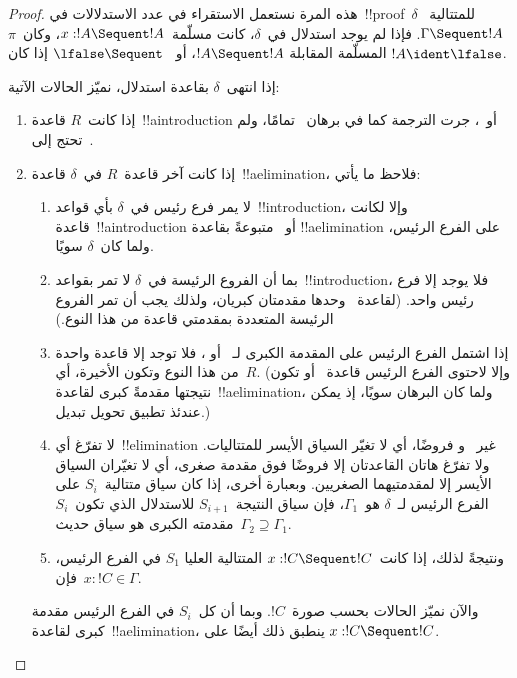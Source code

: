 \documentclass[../../../include/open-logic-section]{subfiles}
\begin{document}
\begin{proof}
هذه المرة نستعمل الاستقراء في عدد الاستدلالات في~!!{proof}~$\delta$
للمتتالية~$\Gamma \Sequent !A$. فإذا لم يوجد استدلال في~$\delta$، كانت
مسلّمة~$x:!A \Sequent !A$، وكان~$\pi$ المسلّمة المقابلة
$!A \Sequent !A$، أو~$\lfalse \Sequent \ $ إذا كان
$!A\ident\lfalse$.

إذا انتهى~$\delta$ بقاعدة استدلال، نميّز الحالات الآتية:
\begin{enumerate}
  \item إذا كانت~$R$ قاعدة~!!a{introduction} أو~\FalseInt، جرت الترجمة
  كما في برهان~ تمامًا، ولم تحتج إلى~\Cut.

  \item إذا كانت آخر قاعدة~$R$ في~$\delta$ قاعدة~!!a{elimination}، فلاحظ
  ما يأتي:
  \begin{enumerate}
    \item لا يمر فرع رئيس في~$\delta$ بأي قواعد~!!{introduction}، وإلا
    لكانت قاعدة~!!a{introduction} أو~\FalseInt{} متبوعةً بقاعدة
    !!a{elimination} على الفرع الرئيس، ولما كان~$\delta$ سويًا.
    \item بما أن الفروع الرئيسة في~$\delta$ لا تمر بقواعد~!!{introduction}،
    فلا يوجد إلا فرع رئيس واحد. (لقاعدة~\Intro{\land} وحدها مقدمتان
    كبريان، ولذلك يجب أن تمر الفروع الرئيسة المتعددة بمقدمتي قاعدة من هذا
    النوع.)
    \item إذا اشتمل الفرع الرئيس على المقدمة الكبرى لـ~\Elim{\lor} أو
    \Elim{\lexists}، فلا توجد إلا قاعدة واحدة من هذا النوع وتكون الأخيرة،
    أي~$R$. (وإلا لاحتوى الفرع الرئيس قاعدة~\Elim{\lor} أو
    \Elim{\lexists} تكون نتيجتها مقدمةً كبرى لقاعدة~!!a{elimination}، ولما
    كان البرهان سويًا، إذ يمكن عندئذ تطبيق تحويل تبديل.)
    \item لا تفرّغ أي~!!{elimination} غير~\Elim{\lor} و\Elim{\lexists}
    فروضًا، أي لا تغيّر السياق الأيسر للمتتاليات. ولا تفرّغ هاتان القاعدتان
    إلا فروضًا فوق مقدمة صغرى، أي لا تغيّران السياق الأيسر إلا لمقدمتيهما
    الصغريين. وبعبارة أخرى، إذا كان سياق متتالية~$S_i$ على الفرع الرئيس
    لـ~$\delta$ هو~$\Gamma_1$، فإن سياق النتيجة~$S_{i+1}$ للاستدلال الذي
    تكون~$S_i$ مقدمته الكبرى هو سياق حديث~$\Gamma_2 \supseteq \Gamma_1$.
    \item ونتيجةً لذلك، إذا كانت~$x:!C \Sequent !C$ المتتالية العليا
    $S_1$ في الفرع الرئيس، فإن~$x:!C \in \Gamma$.
  \end{enumerate}
  والآن نميّز الحالات بحسب صورة~$!C$. وبما أن كل~$S_i$ في الفرع الرئيس
  مقدمة كبرى لقاعدة~!!a{elimination}، ينطبق ذلك أيضًا على
  $x:!C \Sequent !C$.


\end{enumerate}
\end{proof}
\end{document}
